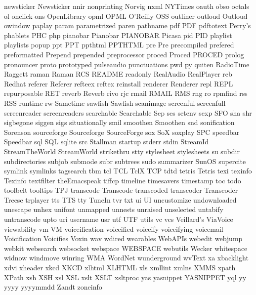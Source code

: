 newsticker
Newsticker
nnir
nonprinting
Norvig
nxml
NYTimes
oauth
obso
octals
ol
onclick
ons
OpenLibrary
opml
OPML
O'Reilly
OSS
outliner
outloud
Outloud
owindow
paplay
param
parametrized
paren
pathname
pdf
PDF
pdftotext
Perry's
phablets
PHC
php
pianobar
Pianobar
PIANOBAR
Picasa
pid
PID
playlist
playlists
popup
ppt
PPT
ppthtml
PPTHTML
pre
Pre
precompiled
prefered
preformatted
Prepend
prepended
preprocessor
proced
Proced
PROCED
prolog
pronouncer
proto
prototyped
pulseaudio
punctuations
pwd
py
quiten
RadioTime
Raggett
raman
Raman
RCS
README
readonly
RealAudio
RealPlayer
reb
Redhat
referer
Referer
refteex
reftex
reinstall
renderer
Renderer
repl
REPL
repurposable
RET
reverb
Reverb
rivo
rjc
rmail
RMAIL
RMS
rng
ro
rpmfind
rss
RSS
runtime
rw
Sametime
sawfish
Sawfish
scanimage
screenful
screenfull
screenreader
screenreaders
searchable
Searchable
Sep
ses
setenv
sexp
SFO
sha
shr
sigbegone
siggen
sigs
situationally
smil
smoothen
Smoothen
snd
sonification
Sorenson
sourceforge
Sourceforge
SourceForge
sox
SoX
soxplay
SPC
speedbar
Speedbar
sql
SQL
sqlite
src
Stallman
startup
stderr
stdin
StreamId
StreamTheWorld
StreamWorld
strikethru
stty
stylesheet
stylesheets
su
subdir
subdirectories
subjob
submode
subr
subtrees
sudo
summarizer
SunOS
supercite
symlink
symlinks
tagsearch
tbm
tcl
TCL
TclX
TCP
tdtd
tetris
Tetris
texi
texinfo
Texinfo
textfilter
theEmacspeak
tiffcp
timeline
timesavers
timestamp
toc
todo
toolbelt
tooltips
TPJ
transcode
Transcode
transcoded
transcoder
Transcoder
Treese
trplayer
tts
TTS
tty
TuneIn
tvr
txt
ui
UI
uncustomize
undownloaded
unescape
unhex
unifont
unmapped
unnests
unraised
unselected
untabify
untranscode
upto
uri
username
usr
utf
UTF
utils
vc
vcs
Veillard's
ViaVoice
viewability
vm
VM
voiceification
voiceified
voiceify
voiceifying
voicemail
Voicification
Voicifies
Voxin
wav
wdired
wearables
WebAPIs
webedit
webjump
webkit
websearch
websocket
webspace
WEBSPACE
webutils
Wecker
whitespace
widnow
windmove
winring
WMA
WordNet
wunderground
wvText
xa
xbacklight
xdvi
xheader
xkcd
XKCD
xlhtml
XLHTML
xls
xmllint
xmlns
XMMS
xpath
XPath
xsh
XSH
xsl
XSL
xslt
XSLT
xsltproc
yas
yasnippet
YASNIPPET
yql
yy
yyyy
yyyymmdd
Zandt
zoneinfo
